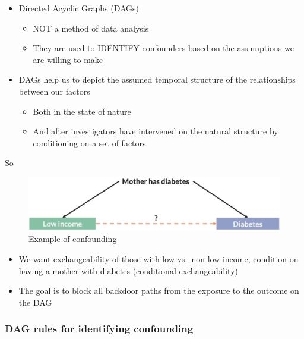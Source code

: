 \documentclass[
]{book}
\providecommand{\tightlist}{%
  \setlength{\itemsep}{0pt}\setlength{\parskip}{0pt}}
\begin{document}
\begin{itemize}
\tightlist
\item
  Directed Acyclic Graphs (DAGs)

  \begin{itemize}
  \tightlist
  \item
    NOT a method of data analysis
  \item
    They are used to IDENTIFY confounders based on the assumptions we are willing to make
  \end{itemize}
\item
  DAGs help us to depict the assumed temporal structure of the relationships between our factors

  \begin{itemize}
  \tightlist
  \item
    Both in the state of nature
  \item
    And after investigators have intervened on the natural structure by conditioning on a set of factors
  \end{itemize}
\end{itemize}

So

\begin{figure}

{\centering \includegraphics[width=1\linewidth]{img/confounding/confounding_example} 

}

\caption{Example of confounding}\label{fig:unnamed-chunk-5}
\end{figure}

\begin{itemize}
\tightlist
\item
  We want exchangeability of those with low vs.~non-low income, condition on having a mother with diabetes (conditional exchangeability)
\item
  The goal is to block all backdoor paths from the exposure to the outcome on the DAG
\end{itemize}

\hypertarget{dag-rules-for-identifying-confounding}{%
\subsubsection{DAG rules for identifying confounding}\label{dag-rules-for-identifying-confounding}}
\end{document}

